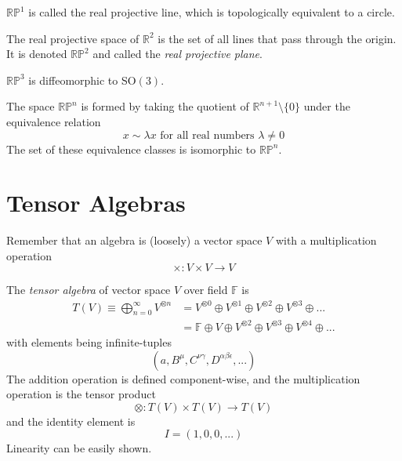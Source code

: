 \documentclass{article}
\begin{document}
    \begin{definition}
    $\mathbb{RP}^1$ is called the real projective line, which is topologically equivalent to a circle. 
    \end{definition}

    \begin{example}
    The real projective space of $\mathbb{R}^2$ is the set of all lines that pass through the origin. It is denoted $\mathbb{R P}^2$ and called the \textit{real projective plane}. 
    \end{example}

    \begin{example}
    $\mathbb{RP}^3$ is diffeomorphic to SO$(3)$. 
    \end{example}

    \begin{example}
    The space $\mathbb{RP}^n$ is formed by taking the quotient of $\mathbb{R}^{n+1} \setminus \{0\}$ under the equivalence relation 
    \[x \sim \lambda x \text{ for all real numbers } \lambda \neq 0\]
    The set of these equivalence classes is isomorphic to $\mathbb{RP}^n$. 
    \end{example}

\section{Tensor Algebras}

  Remember that an algebra is (loosely) a vector space $V$ with a multiplication operation
  \[\times: V \times V \longrightarrow V\]
  \begin{definition}
  The \textit{tensor algebra} of vector space $V$ over field $\mathbb{F}$ is 
  \begin{align*}
      T(V) \equiv \bigoplus_{n = 0}^{\infty} V^{\otimes n} & = V^{\otimes 0} \oplus V^{\otimes 1} \oplus V^{\otimes 2} \oplus V^{\otimes 3} \oplus ... \\
      & = \mathbb{F} \oplus V \oplus V^{\otimes 2} \oplus V^{\otimes 3} \oplus V^{\otimes 4} \oplus ...
  \end{align*}
  with elements being infinite-tuples
  \[ (a, B^\mu, C^{\nu \gamma}, D^{\alpha \beta \epsilon}, ...)\]
  The addition operation is defined component-wise, and the multiplication operation is the tensor product 
  \[\otimes: T(V) \times T(V) \longrightarrow T(V)\]
  and the identity element is
  \[I = (1, 0, 0, ...) \]
  Linearity can be easily shown. 
  \end{definition}
\end{document}
